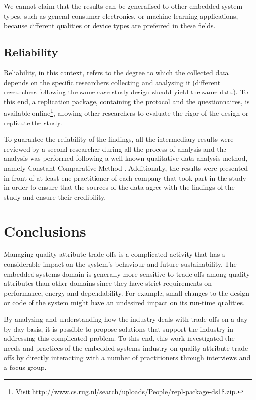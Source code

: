 We cannot claim that the results can be generalised to other embedded system types, such as general consumer electronics, or machine learning applications, because different qualities or device types are preferred in these fields.

\subsection{Reliability}
Reliability, in this context, refers to the degree to which the collected data depends on the specific researchers collecting and analysing it (different researchers following the same case study design should yield the same data).
To this end, a replication package, containing the protocol and the questionnaires, is available online\footnote{Visit \url{http://www.cs.rug.nl/search/uploads/People/repl-package-ds18.zip}. }, allowing other researchers to evaluate the rigor of the design or replicate the study.

To guarantee the reliability of the findings, all the intermediary results were reviewed by a second researcher during all the process of analysis and the analysis was performed following a well-known qualitative data analysis method, namely Constant Comparative Method \cite{Boeije2002}. 
Additionally, the results were presented in front of at least one practitioner of each company that took part in the study in order to ensure that the sources of the data agree with the findings of the study and ensure their credibility.

\section{Conclusions}\label{c7:sec:conclusion}
Managing quality attribute trade-offs is a complicated activity that has a considerable impact on the system's behaviour and future sustainability.
The embedded systems domain is generally more sensitive to trade-offs among quality attributes than other domains since they have strict requirements on performance, energy and dependability.
For example, small changes to the design or code of the system might have an undesired impact on its run-time qualities.

By analyzing and understanding how the industry deals with trade-offs on a day-by-day basis, it is possible to propose solutions that support the industry in addressing this complicated problem.
To this end, this work investigated the needs and practices of the embedded systems industry on quality attribute trade-offs by directly interacting with a number of practitioners through interviews and a focus group.

